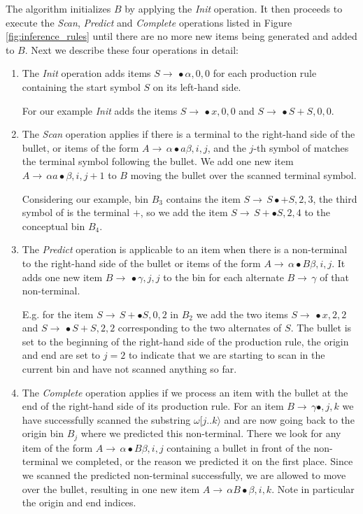 \begin{isabellebody}
\begin{isamarkuptext}
The algorithm initializes $B$ by applying the \textit{Init} operation. It then proceeds to execute
the \textit{Scan}, \textit{Predict} and \textit{Complete} operations listed in Figure \ref{fig:inference_rules}
until there are no more new items being generated and added to $B$. Next we describe these four operations
in detail:

\begin{enumerate}
  \item The \textit{Init} operation adds items
    $S \rightarrow \, \bullet\alpha, 0, 0$ for each production rule containing the start symbol $S$ on its left-hand side.

    For our example \textit{Init} adds the items $S \rightarrow \, \bullet x, 0, 0$ and $S \rightarrow \, \bullet S + S, 0 , 0$.
  \item The \textit{Scan} operation applies if there is a terminal to the right-hand side of the bullet, or items of the form $A \rightarrow \, \alpha \bullet a \beta, i, j$,
    and the $j$-th symbol of \isa{{\isasymomega}} matches the terminal symbol following the bullet. We add one new item $A \rightarrow \, \alpha a \bullet \beta, i, j+1$
    to $B$ moving the bullet over the scanned terminal symbol.

    Considering our example, bin $B_3$ contains
    the item $S \rightarrow \, S \bullet + S, 2, 3$, the third symbol of \isa{{\isasymomega}} is the terminal $+$, so we add the
    item $S \rightarrow \, S + \bullet S, 2, 4$ to the conceptual bin $B_4$.
  \item The \textit{Predict} operation is applicable to an item when there is a non-terminal to the right-hand side of
    the bullet or items of the form $A \rightarrow \, \alpha \bullet B \beta, i, j$. It adds one new item $B \rightarrow \, \bullet \gamma, j, j$
    to the bin for each alternate $B \rightarrow \, \gamma$ of that non-terminal.

    E.g. for the item  $S \rightarrow \, S + \bullet S, 0, 2$ in $B_2$
    we add the two items $S \rightarrow \, \bullet x, 2, 2$ and $S \rightarrow \, \bullet S + S, 2, 2$ corresponding
    to the two alternates of $S$. The bullet is set to the beginning of the right-hand side of the production
    rule, the origin and end are set to $j = 2$ to indicate that we are starting to scan in the current bin and
    have not scanned anything so far.
  \item The \textit{Complete} operation applies if we process an item with the bullet at the end of the
    right-hand side of its production rule. For an item $B \rightarrow \, \gamma \bullet, j, k$ we have successfully scanned the substring
    $\omega [ j..k \rangle$ and are now going back to the origin bin $B_j$ where we predicted this non-terminal. There we look for any item of the form
    $A \rightarrow \, \alpha \bullet B \beta, i, j$ containing a bullet in front of the non-terminal we completed, or the reason we
    predicted it on the first place. Since we scanned the predicted non-terminal successfully, we are allowed to
    move over the bullet, resulting in one new item $A \rightarrow \, \alpha B \bullet \beta, i, k$. Note in particular
    the origin and end indices.


\end{enumerate}
\end{isamarkuptext}
\end{isabellebody}
